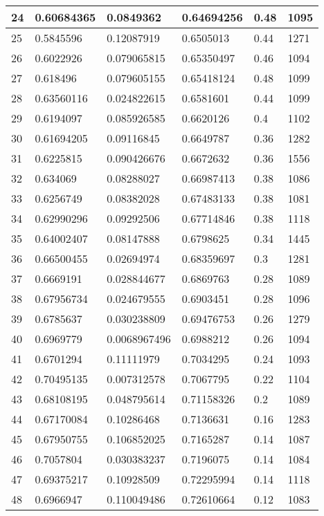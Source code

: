 \begin{longtable}{|l|l|l|l|l|l|}
24 & 0.60684365 & 0.0849362 & 0.64694256 & 0.48 & 1095 \\ \hline 
25 & 0.5845596 & 0.12087919 & 0.6505013 & 0.44 & 1271 \\ \hline 
26 & 0.6022926 & 0.079065815 & 0.65350497 & 0.46 & 1094 \\ \hline 
27 & 0.618496 & 0.079605155 & 0.65418124 & 0.48 & 1099 \\ \hline 
28 & 0.63560116 & 0.024822615 & 0.6581601 & 0.44 & 1099 \\ \hline 
29 & 0.6194097 & 0.085926585 & 0.6620126 & 0.4 & 1102 \\ \hline 
30 & 0.61694205 & 0.09116845 & 0.6649787 & 0.36 & 1282 \\ \hline 
31 & 0.6225815 & 0.090426676 & 0.6672632 & 0.36 & 1556 \\ \hline 
32 & 0.634069 & 0.08288027 & 0.66987413 & 0.38 & 1086 \\ \hline 
33 & 0.6256749 & 0.08382028 & 0.67483133 & 0.38 & 1081 \\ \hline 
34 & 0.62990296 & 0.09292506 & 0.67714846 & 0.38 & 1118 \\ \hline 
35 & 0.64002407 & 0.08147888 & 0.6798625 & 0.34 & 1445 \\ \hline 
36 & 0.66500455 & 0.02694974 & 0.68359697 & 0.3 & 1281 \\ \hline 
37 & 0.6669191 & 0.028844677 & 0.6869763 & 0.28 & 1089 \\ \hline 
38 & 0.67956734 & 0.024679555 & 0.6903451 & 0.28 & 1096 \\ \hline 
39 & 0.6785637 & 0.030238809 & 0.69476753 & 0.26 & 1279 \\ \hline 
40 & 0.6969779 & 0.0068967496 & 0.6988212 & 0.26 & 1094 \\ \hline 
41 & 0.6701294 & 0.11111979 & 0.7034295 & 0.24 & 1093 \\ \hline 
42 & 0.70495135 & 0.007312578 & 0.7067795 & 0.22 & 1104 \\ \hline 
43 & 0.68108195 & 0.048795614 & 0.71158326 & 0.2 & 1089 \\ \hline 
44 & 0.67170084 & 0.10286468 & 0.7136631 & 0.16 & 1283 \\ \hline 
45 & 0.67950755 & 0.106852025 & 0.7165287 & 0.14 & 1087 \\ \hline 
46 & 0.7057804 & 0.030383237 & 0.7196075 & 0.14 & 1084 \\ \hline 
47 & 0.69375217 & 0.10928509 & 0.72295994 & 0.14 & 1118 \\ \hline 
48 & 0.6966947 & 0.110049486 & 0.72610664 & 0.12 & 1083 \\ \hline 

\end{longtable}
